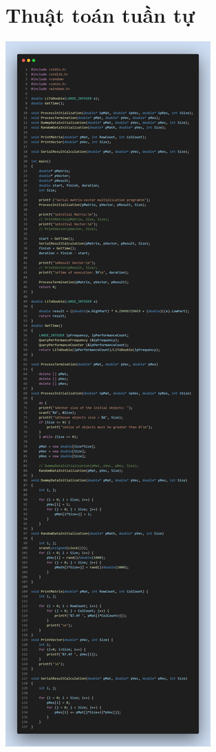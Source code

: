 \documentclass[12pt,a4paper]{report}
\begin{document}
\section{Thuật toán tuần tự}
\begin{center}
    \includegraphics[trim=0in 48in 0in 0in, clip, scale=0.2]{./Photos/MatMul/serial.PNG}\clearpage

\end{center}
\end{document}
